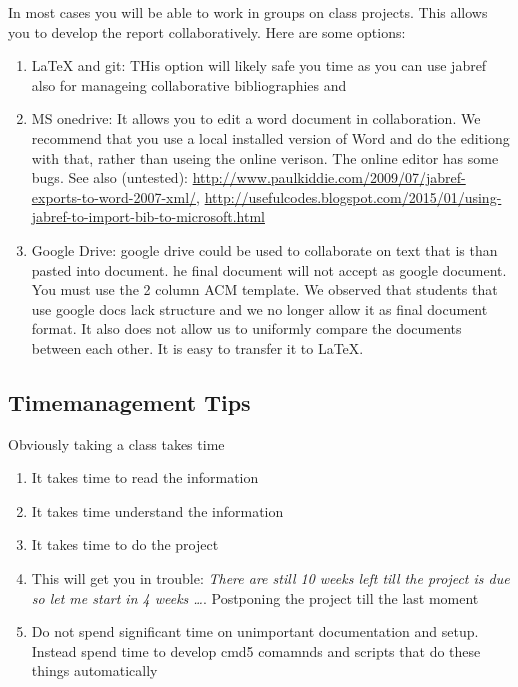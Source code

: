 In most cases you will be able to work in groups on class projects. This
allows you to develop the report collaboratively. Here are some options:

\begin{enumerate}

\item
  LaTeX and git: THis option will likely safe you time as you can use
  jabref also for manageing collaborative bibliographies and
\item
  MS onedrive: It allows you to edit a word document in collaboration.
  We recommend that you use a local installed version of Word and do the
  editiong with that, rather than useing the online verison. The online
  editor has some bugs. See also (untested):
  \url{http://www.paulkiddie.com/2009/07/jabref-exports-to-word-2007-xml/},
  \url{http://usefulcodes.blogspot.com/2015/01/using-jabref-to-import-bib-to-microsoft.html}
\item
  Google Drive: google drive could be used to collaborate on text that
  is than pasted into document. he final document will not accept as
  google document. You must use the 2 column ACM template. We observed
  that students that use google docs lack structure and we no longer
  allow it as final document format. It also does not allow us to
  uniformly compare the documents between each other. It is easy to
  transfer it to LaTeX.
\end{enumerate}

\subsection{Timemanagement Tips}\label{timemanagement-tips}

Obviously taking a class takes time

\begin{enumerate}

\item
  It takes time to read the information
\item
  It takes time understand the information
\item
  It takes time to do the project
\item
  This will get you in trouble: \emph{There are still 10 weeks left till
  the project is due so let me start in 4 weeks \ldots{}}. Postponing
  the project till the last moment
\item
  Do not spend significant time on unimportant documentation and setup.
  Instead spend time to develop cmd5 comamnds and scripts that do these
  things automatically
\end{enumerate}

